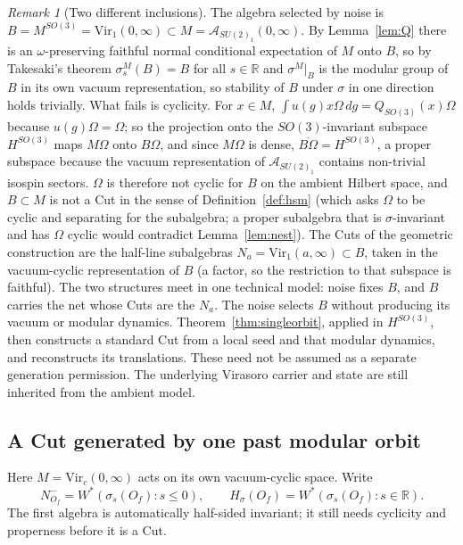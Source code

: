 \documentclass[12pt]{article}
\theoremstyle{definition}
\theoremstyle{remark}
\newtheorem{remark}[theorem]{Remark}
\begin{document}
\begin{remark}[Two different inclusions]\label{rem:twolevel}
The algebra selected by noise is \(B=M^{SO(3)}=\mathrm{Vir}_1(0,\infty)\subset
M=\mathcal A_{SU(2)_1}(0,\infty)\). By Lemma~\ref{lem:Q} there is an
\(\omega\)-preserving faithful normal conditional expectation of \(M\) onto \(B\), so by
Takesaki's theorem \cite{Takesaki} \(\sigma^M_s(B)=B\) for all \(s\in\mathbb R\) and
\(\sigma^M|_B\) is the modular group of \(B\) in its own vacuum representation, so stability of \(B\)
under \(\sigma\) in one direction holds trivially. What fails is cyclicity. For \(x\in M\),
\(\int u(g)x\Omega\,dg=Q_{SO(3)}(x)\Omega\) because \(u(g)\Omega=\Omega\); so the projection onto the
\(SO(3)\)-invariant subspace \(H^{SO(3)}\) maps \(M\Omega\) onto \(B\Omega\), and since \(M\Omega\) is dense,
\(\overline{B\Omega}=H^{SO(3)}\), a proper subspace because the vacuum representation of
\(\mathcal A_{SU(2)_1}\) contains non-trivial isospin sectors. \(\Omega\) is therefore not cyclic for
\(B\) on the ambient Hilbert space, and \(B\subset M\) is not a Cut in the sense of
Definition~\ref{def:hsm} (which asks \(\Omega\) to be cyclic and separating for the subalgebra; a proper
subalgebra that is \(\sigma\)-invariant and has \(\Omega\) cyclic would contradict
Lemma~\ref{lem:nest}). The Cuts of the geometric construction are the half-line subalgebras
\(N_a=\mathrm{Vir}_1(a,\infty)\subset B\), taken in the vacuum-cyclic representation
of \(B\) (a factor, so the restriction to that subspace is faithful). The two structures
meet in one technical model: noise fixes \(B\), and \(B\) carries the net whose Cuts
are the \(N_a\). The noise selects \(B\) without producing its vacuum or modular dynamics.
Theorem~\ref{thm:singleorbit}, applied in \(H^{SO(3)}\), then constructs a
standard Cut from a local seed and that modular dynamics, and reconstructs its
translations. These need not be assumed as a separate generation permission.
The underlying Virasoro carrier and state are still inherited from the
ambient model.
\end{remark}

\subsection{A Cut generated by one past modular orbit}\label{sec:singleorbit}

Here \(M=\mathrm{Vir}_c(0,\infty)\) acts on its own vacuum-cyclic space.
Write
\[
 N^-_{O_f}=W^*(\sigma_s(O_f):s\le0),\qquad
 H_\sigma(O_f)=W^*(\sigma_s(O_f):s\in\mathbb R).
\]
The first algebra is automatically half-sided invariant; it still needs
cyclicity and properness before it is a Cut.
\end{document}
